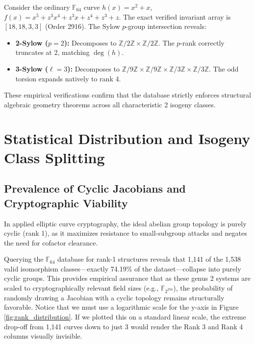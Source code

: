 \documentclass[letterpaper, 11pt]{article}
\begin{document}
Consider the ordinary $\mathbb{F}_{64}$ curve $h(x) = x^2 + x$, $f(x) = x^5 + z^3x^4 + z^3x + z^4 + z^3 + z$. The exact verified invariant array is $[18, 18, 3, 3]$ (Order 2916). The Sylow $p$-group intersection reveals:
\begin{itemize}
    \item \textbf{2-Sylow ($p=2$):} Decomposes to $\mathbb{Z}/2\mathbb{Z} \times \mathbb{Z}/2\mathbb{Z}$. The $p$-rank correctly truncates at 2, matching $\deg(h)$.
    \item \textbf{3-Sylow ($\ell = 3$):} Decomposes to $\mathbb{Z}/9\mathbb{Z} \times \mathbb{Z}/9\mathbb{Z} \times \mathbb{Z}/3\mathbb{Z} \times \mathbb{Z}/3\mathbb{Z}$. The odd torsion expands natively to rank 4.
\end{itemize}
These empirical verifications confirm that the database strictly enforces structural algebraic geometry theorems across all characteristic 2 isogeny classes.

\section{Statistical Distribution and Isogeny Class Splitting}

\subsection{Prevalence of Cyclic Jacobians and Cryptographic Viability}
In applied elliptic curve cryptography, the ideal abelian group topology is purely cyclic (rank 1), as it maximizes resistance to small-subgroup attacks and negates the need for cofactor clearance. 

Querying the $\mathbb{F}_{64}$ database for rank-1 structures reveals that 1,141 of the 1,538 valid isomorphism classes---exactly 74.19\% of the dataset---collapse into purely cyclic groups. This provides empirical assurance that as these genus 2 systems are scaled to cryptographically relevant field sizes (e.g., $\mathbb{F}_{2^{256}}$), the probability of randomly drawing a Jacobian with a cyclic topology remains structurally favorable. Notice that we must use a logarithmic scale for the y-axis in Figure \ref{fig:rank_distribution}. If we plotted this on a standard linear scale, the extreme drop-off from 1,141 curves down to just 3 would render the Rank 3 and Rank 4 columns visually invisible.
\end{document}
